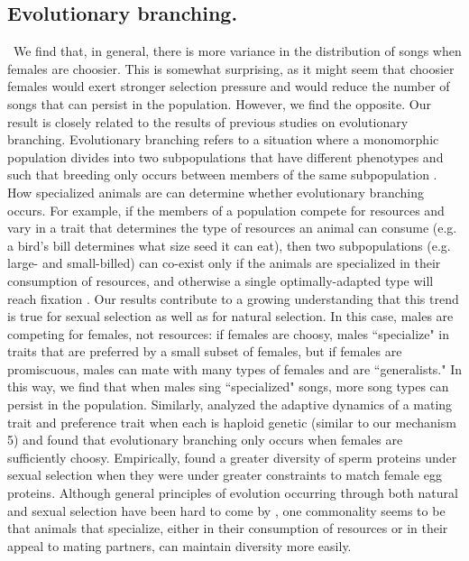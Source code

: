 \documentclass[12pt]{article}
\begin{document}
\subsection*{Evolutionary branching. }
\ We find that, in general, there is more variance in the distribution of songs when females are choosier. This is somewhat surprising, as it might seem that choosier females would exert stronger selection pressure and would reduce the number of songs that can persist in the population. However, we find the opposite.
Our result is closely related to the results of previous studies on evolutionary branching. Evolutionary branching refers to a situation where a monomorphic population divides into two subpopulations that have different phenotypes and such that breeding only occurs between members of the same subpopulation \cite{Doebeli:2000oq,Doorn:2000nx,Weissing:2011hc}. How specialized animals are can determine whether evolutionary branching occurs. For example, if the members of a population compete for resources and vary in a trait that determines the type of resources an animal can consume (e.g. a bird's bill determines what size seed it can eat), then two subpopulations (e.g. large- and small-billed) can co-exist only if the animals are specialized in their consumption of resources, and otherwise a single optimally-adapted type will reach fixation \cite{Doebeli:2000oq,Doorn:2000nx,Weissing:2011hc}. Our results contribute to a growing understanding that this trend is true for sexual selection as well as for natural selection. In this case, males are competing for females, not resources: if females are choosy, males ``specialize" in traits that are preferred by a small subset of females, but if females are promiscuous, males can mate with many types of females and are ``generalists." In this way, we find that when males sing ``specialized" songs, more song types can persist in the population. Similarly, \citet{Doorn:2000nx} analyzed the adaptive dynamics of a mating trait and preference trait when each is haploid genetic (similar to our mechanism 5) and found that evolutionary branching only occurs when females are sufficiently choosy. Empirically, \citet{Van-Doorn:2001fv} found a greater diversity of sperm proteins under sexual selection when they were under greater constraints to match female egg proteins. Although general principles of evolution occurring through both natural and sexual selection have been hard to come by \cite{Kirkpatrick:2002fu}, one commonality seems to be that animals that specialize, either in their consumption of  resources or in their appeal to mating partners, can maintain diversity more easily.
\end{document}
